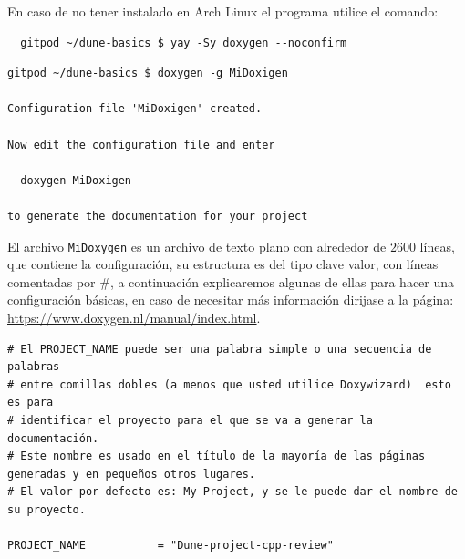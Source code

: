 \begin{frame}[fragile]\LARGE
En caso de no tener instalado en Arch Linux el programa utilice el comando:
\begin{lstlisting}
  gitpod ~/dune-basics $ yay -Sy doxygen --noconfirm
\end{lstlisting}

\begin{lstlisting}
gitpod ~/dune-basics $ doxygen -g MiDoxigen

Configuration file 'MiDoxigen' created.

Now edit the configuration file and enter

  doxygen MiDoxigen

to generate the documentation for your project
\end{lstlisting}
\end{frame}

\begin{frame}
El archivo \lstinline{MiDoxygen} es un archivo de texto plano con alrededor de $2600$ líneas, que contiene la configuración, su estructura es del tipo clave valor, con líneas comentadas por \#, a continuación explicaremos algunas de ellas para hacer una configuración básicas, en caso de necesitar más información dirijase a la página: \url{https://www.doxygen.nl/manual/index.html}.
\end{frame}

\begin{frame}[fragile]\LARGE
\begin{lstlisting}
# El PROJECT_NAME puede ser una palabra simple o una secuencia de palabras 
# entre comillas dobles (a menos que usted utilice Doxywizard)  esto es para 
# identificar el proyecto para el que se va a generar la documentación.
# Este nombre es usado en el título de la mayoría de las páginas generadas y en pequeños otros lugares.
# El valor por defecto es: My Project, y se le puede dar el nombre de su proyecto.

PROJECT_NAME           = "Dune-project-cpp-review"
\end{lstlisting}
\end{frame}

